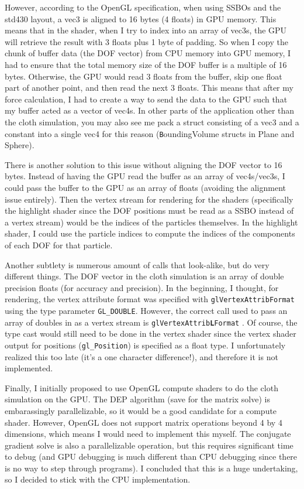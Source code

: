 \documentclass[letterpaper, 10 pt, conference]{ieeeconf}  %
\begin{document}
However, according to the OpenGL specification, when using SSBOs and the std430 layout, a vec3 is aligned to 16 bytes (4 floats) in GPU memory. This means that in the shader, when I try to index into an array of vec3s, the GPU will retrieve the result with 3 floats plus 1 byte of padding. So when I copy the chunk of buffer data (the DOF vector) from CPU memory into GPU memory, I had to ensure that the total memory size of the DOF buffer is a multiple of 16 bytes. Otherwise, the GPU would read 3 floats from the buffer, skip one float part of another point, and then read the next 3 floats. This means that after my force calculation, I had to create a way to send the data to the GPU such that my buffer acted as a vector of vec4s. In other parts of the application other than the cloth simulation, you may also see me pack a struct consisting of a vec3 and a constant into a single vec4 for this reason (\texttt BoundingVolume structs in Plane and Sphere).

There is another solution to this issue without aligning the DOF vector to 16 bytes. Instead of having the GPU read the buffer as an array of vec4s/vec3s, I could pass the buffer to the GPU as an array of floats (avoiding the alignment issue entirely). Then the vertex stream for rendering for the shaders (specifically the highlight shader since the DOF positions must be read as a SSBO instead of a vertex stream) would be the indices of the particles themselves. In the highlight shader, I could use the particle indices to compute the indices of the components of each DOF for that particle. 

Another subtlety is numerous amount of calls that look-alike, but do very different things. The DOF vector in the cloth simulation is an array of double precision floats (for accuracy and precision). In the beginning, I thought, for rendering, the vertex attribute format was specified with \texttt{glVertexAttribFormat} using the type parameter \texttt{GL\_DOUBLE}. However, the correct call used to pass an array of doubles in as a vertex stream is \texttt{glVertexAttrib\textbf{L}Format} \cite{opengl_documentation}. Of course, the type cast would still need to be done in the vertex shader since the vertex shader output for positions (\texttt{gl\_Position}) is specified as a float type. I unfortunately realized this too late (it's a one character difference!), and therefore it is not implemented. 

Finally, I initially proposed to use OpenGL compute shaders to do the cloth simulation on the GPU. The DEP algorithm (save for the matrix solve) is embarassingly parallelizable, so it would be a good candidate for a compute shader. However, OpenGL does not support matrix operations beyond 4 by 4 dimensions, which means I would need to implement this myself. The conjugate gradient solve \cite{bolz2003sparse} is also a parallelizable operation, but this requires significant time to debug (and GPU debugging is much different than CPU debugging since there is no way to step through programs). I concluded that this is a huge undertaking, so I decided to stick with the CPU implementation.
\end{document}
